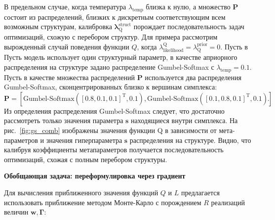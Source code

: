 В предельном случае, когда температура $\lambda_\text{temp}$ близка к нулю, а множество $\mathbf{P}$ состоит из распределений, близких к дискретным соответствующим всем возможным структурам, калибровка $\boldsymbol{\lambda}^\text{struct}_\text{Q}$ порождает последовательность задач оптимизаций, схожую с перебором структур.  Для примера рассмотрим вырожденный случай поведения функции $Q$, когда $\lambda_\text{likelihood}^\text{Q} = \lambda^\text{prior}_\text{Q} = 0$. Пусть в Пусть модель использует один структурный параметр, в качестве априорного распределения на структуре задано распределение Gumbel-Softmax с $\lambda_\text{temp}=0.1$. Пусть в качестве множества распределений $\mathbf{P}$ используется два распределения Gumbel-Softmax, сконцентрированных близко к вершинам симплекса:
\[
    \mathbf{P} = [\text{Gumbel-Softmax}([0.8, 0.1, 0.1]^\text{T}, 0.1) ,\text{Gumbel-Softmax}([0.1, 0.8, 0.1]^\text{T}, 0.1)].
\]
Из определения распределения Gumbel-Softmax следует, что достаточно рассмотреть только значения параметра $\mathbf{s}$ находящиеся внутри симплекса.
На рис.~\ref{fig:gs_comb} изображены значения функции Q в зависимости от мета-параметров и значения гиперпараметра $\mathbf{s}$ распределения на структуре. Видно, что калибруя коэффициенты метапараметров получается последовательность оптимизаций, схожая с полным перебором структуры.


\textbf{Обобщающая задача: переформулировка через градиент}



Для вычисления приближенного значения функций $Q$ и $L$ предлагается использовать приближение методом Монте-Карло с порождением $R$ реализаций величин $\mathbf{w}, \boldsymbol{\Gamma}$:

